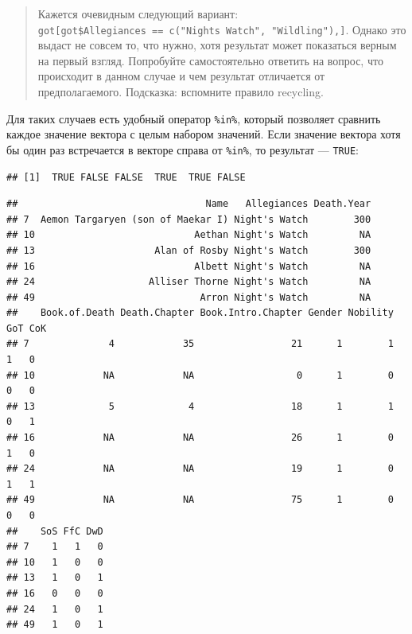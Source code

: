 \documentclass[]{book}
\newenvironment{Shaded}{\begin{snugshade}}{\end{snugshade}}
\newcommand{\DecValTok}[1]{\textcolor[rgb]{0.00,0.00,0.81}{#1}}
\newcommand{\KeywordTok}[1]{\textcolor[rgb]{0.13,0.29,0.53}{\textbf{#1}}}
\newcommand{\NormalTok}[1]{#1}
\newcommand{\OperatorTok}[1]{\textcolor[rgb]{0.81,0.36,0.00}{\textbf{#1}}}
\newcommand{\StringTok}[1]{\textcolor[rgb]{0.31,0.60,0.02}{#1}}
\begin{document}
\begin{quote}
Кажется очевидным следующий вариант: \texttt{got{[}got\$Allegiances\ ==\ c("Night\textquotesingle{}s\ Watch",\ "Wildling"),{]}}. Однако это выдаст не совсем то, что нужно, хотя результат может показаться верным на первый взгляд. Попробуйте самостоятельно ответить на вопрос, что происходит в данном случае и чем результат отличается от предполагаемого. Подсказка: вспомните правило recycling.
\end{quote}

Для таких случаев есть удобный оператор \texttt{\%in\%}, который позволяет сравнить каждое значение вектора с целым набором значений. Если значение вектора хотя бы один раз встречается в векторе справа от \texttt{\%in\%}, то результат --- \texttt{TRUE}:

\begin{Shaded}
\end{Shaded}

\begin{verbatim}
## [1]  TRUE FALSE FALSE  TRUE  TRUE FALSE
\end{verbatim}

\begin{Shaded}
\end{Shaded}

\begin{verbatim}
##                                 Name   Allegiances Death.Year
## 7  Aemon Targaryen (son of Maekar I) Night's Watch        300
## 10                            Aethan Night's Watch         NA
## 13                     Alan of Rosby Night's Watch        300
## 16                            Albett Night's Watch         NA
## 24                    Alliser Thorne Night's Watch         NA
## 49                             Arron Night's Watch         NA
##    Book.of.Death Death.Chapter Book.Intro.Chapter Gender Nobility GoT CoK
## 7              4            35                 21      1        1   1   0
## 10            NA            NA                  0      1        0   0   0
## 13             5             4                 18      1        1   0   1
## 16            NA            NA                 26      1        0   1   0
## 24            NA            NA                 19      1        0   1   1
## 49            NA            NA                 75      1        0   0   0
##    SoS FfC DwD
## 7    1   1   0
## 10   1   0   0
## 13   1   0   1
## 16   0   0   0
## 24   1   0   1
## 49   1   0   1
\end{verbatim}
\end{document}
